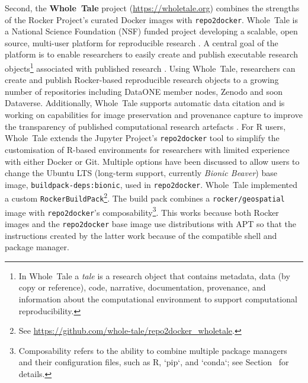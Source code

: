 Second, the \textbf{Whole~Tale} project (\url{https://wholetale.org})
combines the strengths of the Rocker Project's curated Docker images
with \texttt{repo2docker}. Whole~Tale is a National Science Foundation
(NSF) funded project developing a scalable, open source, multi-user
platform for reproducible research \citep{brinckman2019, chard2019a}. A
central goal of the platform is to enable researchers to easily create
and publish executable research
objects\footnote{In Whole~Tale a \emph{tale} is a research object that contains metadata, data (by copy or reference), code, narrative, documentation, provenance, and information about the computational environment to support computational reproducibility.}
associated with published research \citep{chard2019b}. Using Whole~Tale,
researchers can create and publish Rocker-based reproducible research
objects to a growing number of repositories including DataONE member
nodes, Zenodo and soon Dataverse. Additionally, Whole~Tale supports
automatic data citation and is working on capabilities for image
preservation and provenance capture to improve the transparency of
published computational research artefacts
\citep{mecum2018, mcphillips2019}. For R users, Whole~Tale extends the
Jupyter Project's \texttt{repo2docker} tool to simplify the
customisation of R-based environments for researchers with limited
experience with either Docker or Git. Multiple options have been
discussed to allow users to change the Ubuntu LTS (long-term support,
currently \emph{Bionic Beaver}) base image,
\texttt{buildpack-deps:bionic}, used in \texttt{repo2docker}. Whole~Tale
implemented a custom
\texttt{RockerBuildPack}\footnote{See \href{https://github.com/whole-tale/repo2docker\_wholetale}{https://github.com/whole-tale/repo2docker\_wholetale}.}.
The build pack combines a \texttt{rocker/geospatial} image with
\texttt{repo2docker}'s
composability\footnote{Composability refers to the ability to combine multiple package managers and their configuration files, such as R, `pip`, and `conda`; see Section~ for details.}.
This works because both Rocker images and the \texttt{repo2docker} base
image use distributions with APT \citep{wikipedia_contributors_apt_2020}
so that the instructions created by the latter work because of the
compatible shell and package manager.

